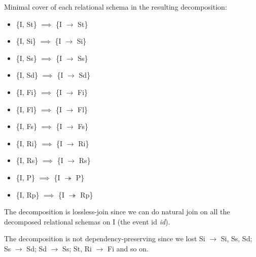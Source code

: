 \documentclass[12pt]{article}
\begin{document}
\begin{enumerate}
        Minimal cover of each relational schema in the resulting decomposition:
        \begin{itemize}
          \item \{I, St\} $\implies$ \{I $\longrightarrow$ St\}
          \item \{I, Si\} $\implies$ \{I $\longrightarrow$ Si\}
          \item \{I, Ss\} $\implies$ \{I $\longrightarrow$ Ss\}
          \item \{I, Sd\} $\implies$ \{I $\longrightarrow$ Sd\}
          \item \{I, Fi\} $\implies$ \{I $\longrightarrow$ Fi\}
          \item \{I, Fl\} $\implies$ \{I $\longrightarrow$ Fl\}
          \item \{I, Fs\} $\implies$ \{I $\longrightarrow$ Fs\}
          \item \{I, Ri\} $\implies$ \{I $\longrightarrow$ Ri\}
          \item \{I, Rs\} $\implies$ \{I $\longrightarrow$ Rs\}
          \item \{I, P\} $\implies$ \{I $\twoheadrightarrow$ P\}
          \item \{I, Rp\} $\implies$ \{I $\twoheadrightarrow$ Rp\}
        \end{itemize}

        The decomposition is lossless-join since we can do natural join on all
        the decomposed relational schemas on I (the event id \emph{id}).

        The decomposition is not dependency-preserving since we lost Si
        $\longrightarrow$ Si, Ss, Sd; Ss $\longrightarrow$ Sd; Sd
        $\longrightarrow$ Ss; St, Ri $\longrightarrow$ Fi and so on.


\end{enumerate}
\end{document}
